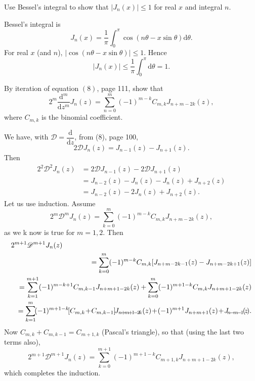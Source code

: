 \begin{problem}\label{problem7chapter6}
Use Bessel's integral to show that $|J_n(x)| \leq 1$ for real $x$ and integral $n$.
\end{problem}
\begin{solution}
Bessel's integral is
$$J_n(x) = \dfrac{1}{\pi} \displaystyle\int_0^{\pi} \cos(n \theta - x \sin \theta) \mathrm{d} \theta.$$
For real $x$ (and $n$), $|\cos(n \theta - x \sin \theta)| \leq 1$. Hence
$$|J_n(x)| \leq \dfrac{1}{\pi} \displaystyle\int_0^{\pi} \mathrm{d} \theta = 1.$$
\end{solution}
\begin{problem} \label{problem8chapter6}
By iteration of equation $(8)$, page 111, show that
$$2^m \dfrac{\mathrm{d}^m}{\mathrm{d}z^m} J_n(z) = \displaystyle\sum_{n=0}^m (-1)^{m-k} C_{m,k} J_{n+m-2k}(z),$$
where $C_{m,k}$ is the binomial coefficient.
\end{problem}
\begin{solution}
We have, with $\mathscr{D} = \dfrac{\mathrm{d}}{\mathrm{d}z}$, from (8), page 100,
$$2 \mathscr{D}J_n(z) = J_{n-1}(z) - J_{n+1}(z).$$
Then
$$\begin{array}{ll}
2^2 \mathscr{D}^2J_n(z) &= 2 \mathscr{D}J_{n-1}(z) - 2 \mathscr{D}J_{n+1}(z) \\
&= J_{n-2}(z) - J_n(z) - J_n(z) + J_{n+2}(z) \\
&= J_{n-2}(z) - 2J_n(z) + J_{n+2}(z).
\end{array}$$
Let us use induction. Assume
$$2^m \mathscr{D}^m J_n(z) = \displaystyle\sum_{k=0}^m (-1)^{m-k} C_{m,k} J_{n+m-2k}(z),$$
as we k now is true for $m=1,2.$ Then
\begin{eqnarray*}
\lefteqn{2^{m+1} \mathscr{D}^{m+1}J_n(z)} \\
& &= \displaystyle\sum_{k=0}^m (-1)^{m-k} C_{m,k} [J_{n+m-2k-1}(z) - J_{n+m-2k+1}(z) ] \\
& &= \displaystyle\sum_{k=1}^{m+1} (-1)^{m-k+1} C_{m, k-1} J_{n+m+1-2k}(z) + \displaystyle\sum_{k=0}^m (-1)^{m+1-k} C_{m,k} J_{n+m+1-2k}(z) \\
& &= \displaystyle\sum_{k=1}^m\!(-1)^{m+1-k}\![C_{m,k}\!+\!C_{m,k-1}]\!J_{n\!+\!m\!+\!1\!-\!2\!k}(z)\!+ \!(-1)^{m+1} J_{n+m+1}(z)\!+\!J_{\!n\!-\!m\!-\!1\!}(\!z\!).
\end{eqnarray*}
Now $C_{m,k}+C_{m,k-1} = C_{m+1,k}$ (Pascal's triangle), so that (using the last two terms also),
$$2^{m+1}\mathscr{D}^{m+1}J_n(z) = \displaystyle\sum_{k=0}^{m+1} (-1)^{m+1-k} C_{m+1,k} J_{n+m+1-2k}(z),$$
which completes the induction.
\end{solution}
